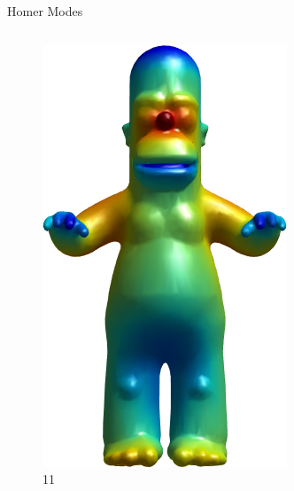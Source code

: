 \documentclass{beamer}
\begin{document}
\begin{frame}{Homer Modes}
\begin{columns}
\begin{column}[T]{3cm}
\begin{figure}[t]
    \includegraphics[width=\textwidth]{Harmonics/HomerModes/11.png}
    \caption*{\huge 11}
\end{figure}
\end{column}
\end{columns}

\end{frame}
\end{document}
